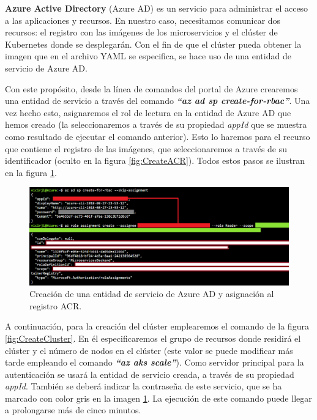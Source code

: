 \documentclass[11pt,spanish,listoffigures]{tfgetsinf}
\begin{document}
\textbf{Azure Active Directory} (Azure AD) es un servicio para administrar el acceso a las aplicaciones y recursos. En nuestro caso, necesitamos comunicar dos recursos: el registro con las imágenes de los microservicios y el clúster de Kubernetes donde se desplegarán. Con el fin de que el clúster pueda obtener la imagen que en el archivo YAML se especifica, se hace uso de una entidad de servicio de Azure AD.

Con este propósito, desde la línea de comandos del portal de Azure crearemos una entidad de servicio a través del comando \textit{\textbf{``az ad sp create-for-rbac''}}. Una vez hecho esto, asignaremos el rol de lectura en la entidad de Azure AD que hemos creado (la seleccionaremos a través de su propiedad \textit{appId} que se muestra como resultado de ejecutar el comando anterior). Esto lo haremos para el recurso que contiene el registro de las imágenes, que seleccionaremos a través de su identificador (oculto en la figura \ref{fig:CreateACR}). Todos estos pasos se ilustran en la figura \ref{fig:ActiveDirectory}.

\begin{figure}[h]
\centering
\includegraphics[scale=0.5]{ActiveDirectory}
\caption{Creación de una entidad de servicio de Azure AD y asignación al registro ACR.}
\label{fig:ActiveDirectory}
\end{figure}

A continuación, para la creación del clúster emplearemos el comando de la figura \ref{fig:CreateCluster}. En él especificaremos el grupo de recursos donde residirá el clúster y el número de nodos en el clúster (este valor se puede modificar más tarde empleando el comando \textit{\textbf{``az aks scale''}}). Como servidor principal para la autenticación se usará la entidad de servicio creada, a través de su propiedad \textit{appId}. También se deberá indicar la contraseña de este servicio, que se ha marcado con color gris en la imagen \ref{fig:ActiveDirectory}. La ejecución de este comando puede llegar a prolongarse más de cinco minutos.
\end{document}
